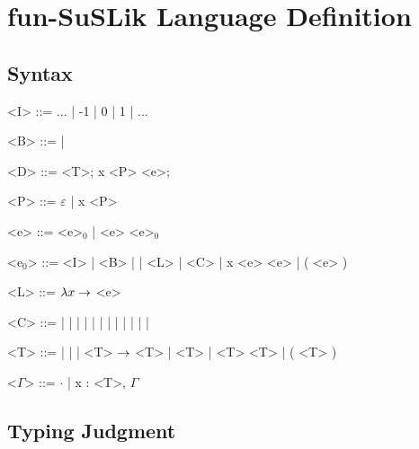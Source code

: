 \documentclass[10pt]{article}
\begin{document}
\section{fun-SuSLik Language Definition}
\label{sec:FSDef}
\subsection{Syntax}

\begin{grammar}
  <I> ::= ... | -1 | 0 | 1 | ...

  <B> ::=  | 

  <D> ::=  <T>; x <P> \ttt{:=} <e>;

  <P> ::= $\varepsilon$ | x <P>

  <e> ::= <e>$_0$ | <e> <e>$_0$

  <e$_0$> ::= <I> | <B> |  | <L> | <C> | \; x \ttt{:=} <e> \inexpr\; <e> | ( <e> )

  <L> ::= $\lambda x \rightarrow$ <e>

  <C> ::= \head\; | \tail\; | \cons\; | \nil\; | \foldr\; | \pair\; | \fst\; | \snd\; | \ite\; | \lesseq\; | \eq\; | \add\; | \sub

  <T> ::=  |  |  | <T> $\rightarrow$ <T> |  <T> |  <T> <T> | ( <T> )

  <$\Gamma$> ::= $\cdot$ | x : <T>, $\Gamma$
\end{grammar}

\subsection{Typing Judgment}
\end{document}
